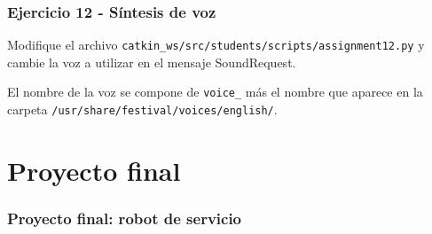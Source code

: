 \begin{frame}[containsverbatim]\frametitle{Ejercicio 12 - Síntesis de voz}
  Modifique el archivo \texttt{catkin\_ws/src/students/scripts/assignment12.py} y cambie la voz a utilizar en el mensaje SoundRequest.
  
  El nombre de la voz se compone de \texttt{voice\_} más el nombre que aparece en la carpeta \texttt{/usr/share/festival/voices/english/}. 
\end{frame}

\section{Proyecto final}

\begin{frame}\frametitle{Proyecto final: robot de servicio}
\end{frame}
